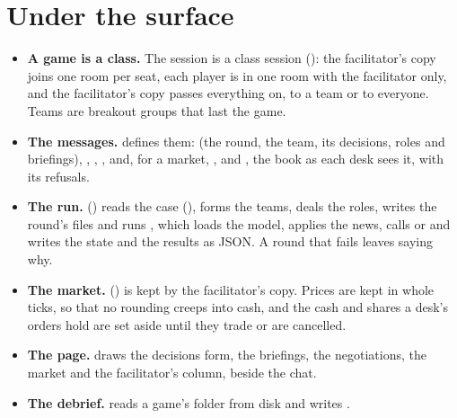 \section{Under the surface}\label{sec:machinery}
\begin{itemize}
  \item \textbf{A game is a class.} The session is a class session (): the facilitator's
    copy joins one room per seat, each player is in one room with the facilitator only, and the facilitator's
    copy passes everything on, to a team or to everyone. Teams are breakout groups that last the game.
  \item \textbf{The messages.}  defines them:  (the round, the team, its
    decisions, roles and briefings), , , , and, for a market,
    ,  and , the book as each desk sees it, with its refusals.
  \item \textbf{The run.}  () reads the case (), forms the
    teams, deals the roles, writes the round's files and runs , which loads the model,
    applies the news, calls  or  and writes the state and the results as JSON. A round that
    fails leaves  saying why.
  \item \textbf{The market.}  () is kept by the facilitator's copy.
    Prices are kept in whole ticks, so that no rounding creeps into cash, and the cash and shares a desk's orders
    hold are set aside until they trade or are cancelled.
  \item \textbf{The page.}  draws the decisions form, the briefings, the negotiations,
    the market and the facilitator's column, beside the chat.
  \item \textbf{The debrief.}  reads a game's folder from disk and writes
    .
\end{itemize}

